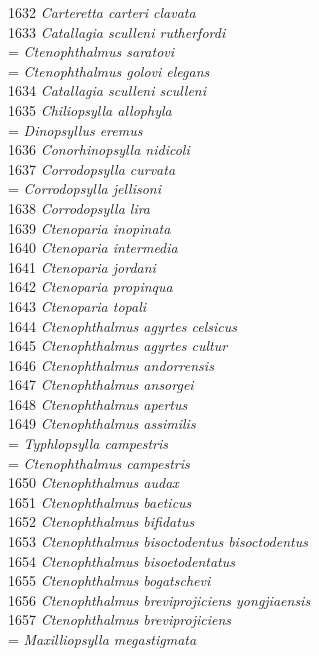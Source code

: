 \documentclass[
]{article}
\begin{document}
1632 \emph{Carteretta carteri clavata}\\
1633 \emph{Catallagia sculleni rutherfordi}\\
= \emph{Ctenophthalmus saratovi}\\
= \emph{Ctenophthalmus golovi elegans}\\
1634 \emph{Catallagia sculleni sculleni}\\
1635 \emph{Chiliopsylla allophyla}\\
= \emph{Dinopsyllus eremus}\\
1636 \emph{Conorhinopsylla nidicoli}\\
1637 \emph{Corrodopsylla curvata}\\
= \emph{Corrodopsylla jellisoni}\\
1638 \emph{Corrodopsylla lira}\\
1639 \emph{Ctenoparia inopinata}\\
1640 \emph{Ctenoparia intermedia}\\
1641 \emph{Ctenoparia jordani}\\
1642 \emph{Ctenoparia propinqua}\\
1643 \emph{Ctenoparia topali}\\
1644 \emph{Ctenophthalmus agyrtes celsicus}\\
1645 \emph{Ctenophthalmus agyrtes cultur}\\
1646 \emph{Ctenophthalmus andorrensis}\\
1647 \emph{Ctenophthalmus ansorgei}\\
1648 \emph{Ctenophthalmus apertus}\\
1649 \emph{Ctenophthalmus assimilis}\\
= \emph{Typhlopsylla campestris}\\
= \emph{Ctenophthalmus campestris}\\
1650 \emph{Ctenophthalmus audax}\\
1651 \emph{Ctenophthalmus baeticus}\\
1652 \emph{Ctenophthalmus bifidatus}\\
1653 \emph{Ctenophthalmus bisoctodentus bisoctodentus}\\
1654 \emph{Ctenophthalmus bisoetodentatus}\\
1655 \emph{Ctenophthalmus bogatschevi}\\
1656 \emph{Ctenophthalmus breviprojiciens yongjiaensis}\\
1657 \emph{Ctenophthalmus breviprojiciens}\\
= \emph{Maxilliopsylla megastigmata}\\
\end{document}
